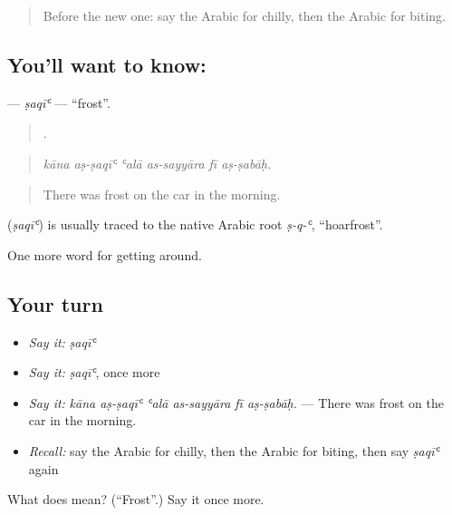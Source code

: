 \label{lesson:AR-C483-saqi}



\begin{quote}
Before the new one: say the Arabic for chilly, then the Arabic for biting.
\end{quote}

\subsection*{You'll want to know: }
\textbf{} — \emph{ṣaqīʿ} — \textquotedblleft{}frost\textquotedblright{}.

\begin{quote}
     .
\end{quote}

\begin{quote}
\emph{kāna aṣ-ṣaqīʿ ʿalā as-sayyāra fī aṣ-ṣabāḥ.}
\end{quote}

\begin{quote}
There was frost on the car in the morning.
\end{quote}

\begin{cousinweb}
\textbf{} (\emph{ṣaqīʿ}) is usually traced to the native Arabic root \emph{ṣ-q-ʿ}, \textquotedblleft{}hoarfrost\textquotedblright{}.
\end{cousinweb}

\begin{grammarlens}[title={What you've built}]
One more word for getting around.
\end{grammarlens}

\subsection*{Your turn}
\begin{itemize}
\raggedright
  \item \emph{Say it:} \emph{ṣaqīʿ}
  \item \emph{Say it:} \emph{ṣaqīʿ}, once more
  \item \emph{Say it:} \emph{kāna aṣ-ṣaqīʿ ʿalā as-sayyāra fī aṣ-ṣabāḥ.} — There was frost on the car in the morning.
  \item \emph{Recall:} say the Arabic for chilly, then the Arabic for biting, then say \emph{ṣaqīʿ} again
\end{itemize}

\begin{tcolorbox}[breakable,colback=teal!4,colframe=teal!35!black,title={Before you move on}]
What does  mean? (\textquotedblleft{}Frost\textquotedblright{}.) Say it once more.
\end{tcolorbox}
